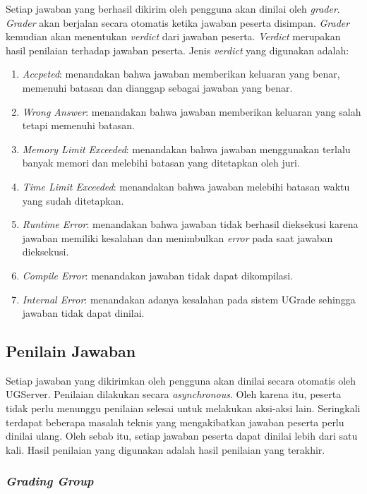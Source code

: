 \par Setiap jawaban yang berhasil dikirim oleh pengguna akan dinilai oleh \textit{grader}. \textit{Grader} akan berjalan secara otomatis ketika jawaban peserta disimpan. \textit{Grader} kemudian akan menentukan \textit{verdict} dari jawaban peserta. \textit{Verdict} merupakan hasil penilaian terhadap jawaban peserta. Jenis \textit{verdict} yang digunakan adalah:
\begin{enumerate}
    \item \textit{Accpeted}: menandakan bahwa jawaban memberikan keluaran yang benar, memenuhi batasan dan dianggap sebagai jawaban yang benar.
    \item \textit{Wrong Answer}: menandakan bahwa jawaban memberikan keluaran yang salah tetapi memenuhi batasan.
    \item \textit{Memory Limit Exceeded}: menandakan bahwa jawaban menggunakan terlalu banyak memori dan melebihi batasan yang ditetapkan oleh juri.
    \item \textit{Time Limit Exceeded}: menandakan bahwa jawaban melebihi batasan waktu yang sudah ditetapkan.
    \item \textit{Runtime Error}: menandakan bahwa jawaban tidak berhasil dieksekusi karena jawaban memiliki kesalahan dan menimbulkan \textit{error} pada saat jawaban dieksekusi.
    \item \textit{Compile Error}: menandakan jawaban tidak dapat dikompilasi.
    \item \textit{Internal Error}: menandakan adanya kesalahan pada sistem UGrade sehingga jawaban tidak dapat dinilai.
\end{enumerate}

\subsection{Penilain Jawaban}

\par Setiap jawaban yang dikirimkan oleh pengguna akan dinilai secara otomatis oleh UGServer. Penilaian dilakukan secara \textit{asynchronous}. Oleh karena itu, peserta tidak perlu menunggu penilaian selesai untuk melakukan aksi-aksi lain. Seringkali terdapat beberapa masalah teknis yang mengakibatkan jawaban peserta perlu dinilai ulang. Oleh sebab itu, setiap jawaban peserta dapat dinilai lebih dari satu kali. Hasil penilaian yang digunakan adalah hasil penilaian yang terakhir.

\subsubsection{\textit{Grading Group}}

